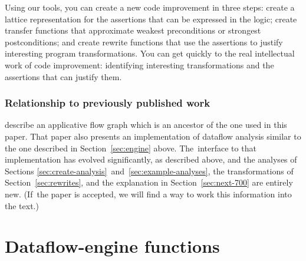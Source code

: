 \documentclass[blockstyle,preprint,natbib,nocopyrightspace]{sigplanconf}
\newcommand\secref[1]{Section~\ref{sec:#1}}
\newcommand\secreftwo[2]{Sections \ref{sec:#1}~and~\ref{sec:#2}}
\begin{document}
%
%
Using our tools,
you can create a new code improvement in three steps:
create a lattice representation for the assertions that can be
expressed in the logic;
create transfer functions that approximate weakest preconditions or
strongest postconditions;
and 
create rewrite functions that use the assertions to justify
interesting program transformations.  
You can get quickly to the real 
intellectual work of code improvement: identifying interesting
transformations and the assertions that can justify them.

\makeatother

\providecommand\includeftpref{\relax} %


\subsubsection*{Relationship to previously published work}

\citet{ramsey-dias:applicative-flow-graph} describe
an applicative flow graph which is
an ancestor of the one used in this paper. 
That paper also presents an implementation of dataflow analysis
similar to the one described in \secref{engine} above.
The~interface to that implementation has evolved significantly, as
described above, and the analyses of
\secreftwo{create-analysis}{example-analyses}, the transformations of
\secref{rewrites}, and the 
explanation in \secref{next-700} are entirely new.
(If~the paper is accepted, we will find a way to work this information
into the text.)


\clearpage

\appendix

\section{Dataflow-engine functions}
\end{document}
